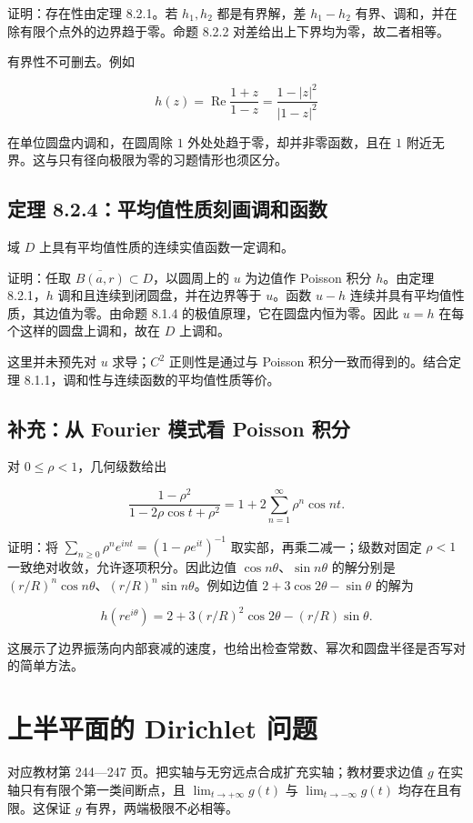 \documentclass[11pt,a4paper]{article}
\begin{document}
证明：存在性由定理 8.2.1。若 \(h_1,h_2\) 都是有界解，差 \(h_1-h_2\)
有界、调和，并在除有限个点外的边界趋于零。命题 8.2.2
对差给出上下界均为零，故二者相等。

有界性不可删去。例如

\[
h(z)=\operatorname{Re}\frac{1+z}{1-z}=\frac{1-|z|^2}{|1-z|^2}\tag{8.2.D}
\]

在单位圆盘内调和，在圆周除 \(1\) 外处处趋于零，却并非零函数，且在 \(1\)
附近无界。这与只有径向极限为零的习题情形也须区分。

\subsection{定理 8.2.4：平均值性质刻画调和函数}\label{ch08-s2-heading-5}

域 \(D\) 上具有平均值性质的连续实值函数一定调和。

证明：任取 \(\overline{B(a,r)}\subset D\)，以圆周上的 \(u\) 为边值作
Poisson 积分 \(h\)。由定理 8.2.1，\(h\) 调和且连续到闭圆盘，并在边界等于
\(u\)。函数 \(u-h\) 连续并具有平均值性质，其边值为零。由命题 8.1.4
的极值原理，它在圆盘内恒为零。因此 \(u=h\) 在每个这样的圆盘上调和，故在
\(D\) 上调和。

这里并未预先对 \(u\) 求导；\(C^2\) 正则性是通过与 Poisson
积分一致而得到的。结合定理 8.1.1，调和性与连续函数的平均值性质等价。

\subsection*{补充：从 Fourier 模式看 Poisson 积分}\label{ch08-s2-heading-6}

对 \(0\le\rho<1\)，几何级数给出

\[
\frac{1-\rho^2}{1-2\rho\cos t+\rho^2}
=1+2\sum_{n=1}^{\infty}\rho^n\cos nt.\tag{8.2.E}
\]

证明：将 \(\sum_{n\ge0}\rho^ne^{int}=(1-\rho e^{it})^{-1}\)
取实部，再乘二减一；级数对固定 \(\rho<1\)
一致绝对收敛，允许逐项积分。因此边值 \(\cos n\theta\)、\(\sin n\theta\)
的解分别是 \((r/R)^n\cos n\theta\)、\((r/R)^n\sin n\theta\)。例如边值
\(2+3\cos2\theta-\sin\theta\) 的解为

\[
h(re^{i\theta})=2+3(r/R)^2\cos2\theta-(r/R)\sin\theta.\tag{8.2.F}
\]

这展示了边界振荡向内部衰减的速度，也给出检查常数、幂次和圆盘半径是否写对的简单方法。

\section{上半平面的 Dirichlet 问题}
对应教材第 244---247 页。把实轴与无穷远点合成扩充实轴；教材要求边值
\(g\) 在实轴只有有限个第一类间断点，且 \(\lim_{t\to+\infty}g(t)\) 与
\(\lim_{t\to-\infty}g(t)\) 均存在且有限。这保证 \(g\)
有界，两端极限不必相等。
\end{document}
